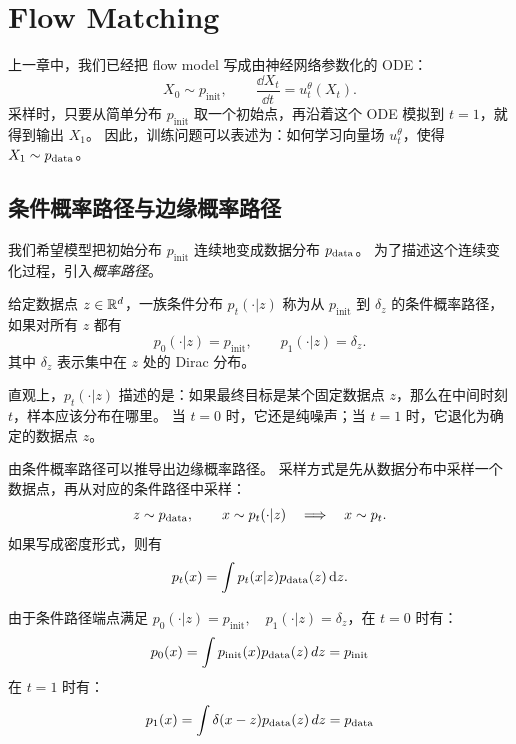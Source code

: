 ﻿\section{Flow Matching}

上一章中，我们已经把 flow model 写成由神经网络参数化的 ODE：
\begin{equation}
X_0 \sim p_{\mathrm{init}}, \qquad
\frac{\dd X_t}{\dd t}=u_t^\theta(X_t).
\end{equation}
采样时，只要从简单分布 $p_{\mathrm{init}}$ 取一个初始点，再沿着这个 ODE 模拟到 $t=1$，就得到输出 $X_1$。
因此，训练问题可以表述为：如何学习向量场 $u_t^\theta$，使得 $X_1 \sim p_{\mathrm{data}}$。

\subsection{条件概率路径与边缘概率路径}

我们希望模型把初始分布 $p_{\mathrm{init}}$ 连续地变成数据分布 $p_{\mathrm{data}}$。
为了描述这个连续变化过程，引入\emph{概率路径}。

\begin{definition}[条件概率路径]
给定数据点 $z \in \mathbb{R}^d$，一族条件分布 $p_t(\cdot|z)$ 称为从 $p_{\mathrm{init}}$ 到 $\delta_{z}$ 的条件概率路径，如果对所有 $z$ 都有
\begin{equation}
p_0(\cdot|z)=p_{\mathrm{init}},
\qquad
p_1(\cdot|z)=\delta_{z}.
\end{equation}
其中 $\delta_{z}$ 表示集中在 $z$ 处的 Dirac 分布。
\end{definition}

直观上，$p_t(\cdot|z)$ 描述的是：如果最终目标是某个固定数据点 $z$，那么在中间时刻 $t$，样本应该分布在哪里。
当 $t=0$ 时，它还是纯噪声；当 $t=1$ 时，它退化为确定的数据点 $z$。

由条件概率路径可以推导出边缘概率路径。
采样方式是先从数据分布中采样一个数据点，再从对应的条件路径中采样：
\begin{equation}
z \sim p_{\mathrm{data}},
\qquad
x \sim p_t(\cdot|z)
\quad \Longrightarrow \quad
x \sim p_t.
\end{equation}
如果写成密度形式，则有
\begin{equation}
p_t(x)=\int p_t(x|z)p_{\mathrm{data}}(z)\,\mathrm{d} z.
\end{equation}

由于条件路径端点满足 $ p_0(\cdot|z)=p_{\mathrm{init}}, \quad p_1(\cdot|z)=\delta_{z}$，在 $t=0$ 时有：
\begin{equation}
  p_0(x)=\int p_{\mathrm{init}}(x)p_{\mathrm{data}}(z)\,dz = p_{\mathrm{init}}
\end{equation}
在 $t=1$ 时有：
\begin{equation}
  p_1(x)=\int \delta(x-z)p_{\mathrm{data}}(z)\,dz = p_{\mathrm{data}}
\end{equation}


